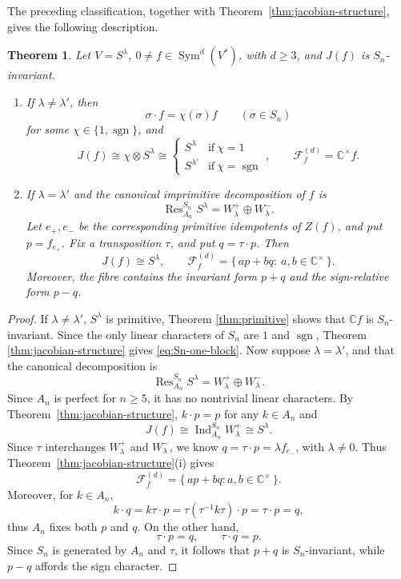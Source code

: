 \documentclass[11pt,reqno]{amsart}
\numberwithin{equation}{section}
\newtheorem{theorem}{Theorem}[section]
\theoremstyle{definition}
\theoremstyle{remark}
\newcommand{\C}{\mathbb C}
\newcommand{\Sym}{\operatorname{Sym}}
\newcommand{\Ind}{\operatorname{Ind}}
\newcommand{\Res}{\operatorname{Res}}
\newcommand{\sgn}{\operatorname{sgn}}
\newcommand{\cF}{\mathcal F}
\begin{document}
The preceding classification, together with
Theorem~\ref{thm:jacobian-structure}, gives the following description.

\begin{theorem}
\label{thm:Sn-classification}
Let $V=S^\lambda$, $0\ne f\in\Sym^d(V^*)$, with $d\geq3$, and $J(f)$ is $S_n$-invariant.
\smallskip

\begin{enumerate}[label=\textup{(\roman*)},leftmargin=0.9cm]
\item
If $\lambda\neq \lambda'$,  then 
\[
  \sigma\cdot f=\chi(\sigma)f
  \qquad(\sigma\in S_n)
\]
for some $\chi\in\{1,\sgn\}$, and
\begin{equation}\label{eq:Sn-one-block}
  J(f)\cong\chi\otimes S^\lambda\cong \begin{cases}
  S^{\lambda} & \text{if}\ \chi=1\\
  S^{\lambda'} & \text{if}\ \chi=\sgn
  \end{cases},
  \qquad
  \cF_f^{(d)}=\C^\times f.
\end{equation}

\item  If $\lambda=\lambda'$ and the canonical imprimitive
decomposition of $f$ is
\[
  \Res_{A_n}^{S_n}S^\lambda
  =
  W_\lambda^+\oplus W_\lambda^-.
\]
Let $e_+,e_-$ be the corresponding primitive idempotents of $Z(f)$,
and put $p=f_{e_+}$. Fix a transposition $\tau$, and put $q=\tau\cdot p$. Then
\begin{equation}\label{eq:Sn-two-block}
  J(f)\cong S^\lambda,
  \qquad
  \cF_f^{(d)}
  =
  \{\,a p+b q:\ a,b\in\C^\times\,\}.
\end{equation}
  Moreover, the fibre contains the invariant form $p+q$
 and the sign-relative form $p-q$.
\end{enumerate}
\end{theorem}

\begin{proof}
If $\lambda\neq \lambda'$, $S^{\lambda}$ is primitive, Theorem \ref{thm:primitive} shows that $\C f$ is $S_n$-invariant. Since the only linear characters of $S_n$ are $1$ and $\sgn$, Theorem \ref{thm:jacobian-structure} gives
\eqref{eq:Sn-one-block}.  Now suppose $\lambda=\lambda'$, and that the canonical decomposition is
\[
  \Res_{A_n}^{S_n}S^\lambda
  =
  W_\lambda^+\oplus W_\lambda^-.
\]
Since $A_n$ is perfect for $n\geq5$, it has no nontrivial linear
characters.  By
Theorem~\ref{thm:jacobian-structure}, $k\cdot p=p$ for any $k\in A_n$ and
\[
  J(f)
  \cong
  \Ind_{A_n}^{S_n}W_\lambda^+
  \cong
  S^\lambda.
\]
Since $\tau$
interchanges $W_\lambda^+$ and $W_\lambda^-$, we know $q=\tau\cdot p=\lambda f_{e_-}$, with $\lambda\neq 0$.  Thus Theorem~\ref{thm:jacobian-structure}\textup{(i)} gives
\[
  \cF_f^{(d)}
  =
  \{\,ap+bq:a,b\in\C^\times\,\}.
\]
Moreover, for $k\in A_n$,
\[
  k\cdot q
  =
  k\tau\cdot p
  =
  \tau(\tau^{-1}k\tau)\cdot p
  =
  \tau\cdot p
  =
  q,
\]
thus $A_n$ fixes both $p$ and $q$.
On the other hand,
\[
  \tau\cdot p=q,
  \qquad
  \tau\cdot q=p.
\]
Since $S_n$ is generated by $A_n$ and $\tau$, it follows that $p+q$ is $S_n$-invariant, while $p-q$ affords the sign character.
\end{proof}
\end{document}

